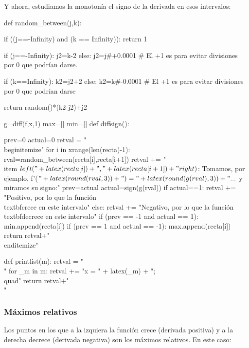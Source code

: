 
Y ahora, estudiamos la monotonía el signo de la derivada en esos intervalos:
   
\begin{sagesilent}

def random_between(j,k):
    

    if ((j==-Infinity) and (k == Infinity)):
        return 1

    if (j==-Infinity):
        j2=k-2
    else:
        j2=j#+0.0001 # El +1 es para evitar divisiones por 0 que podrían darse.
        
    if (k==Infinity):
        k2=j2+2
    else:        
        k2=k#-0.0001 # El +1 es para evitar divisiones por 0 que podrían darse

    return random()*(k2-j2)+j2

g=diff(f,x,1)
max=[]
min=[]
def diffsign():

    prev=0
    actual=0
    retval = "\\begin{itemize}"
    for i in xrange(len(recta)-1):
        rval=random_between(recta[i],recta[i+1])
        retval += "\\item $\\left("+latex(recta[i])+","+latex(recta[i+1])+"\\right)$: Tomamos, por ejemplo, f'($"+latex(round(rval,3))+") = "+latex(round(g(rval),3))+"...$  y miramos su signo:" 
        prev=actual
        actual=sign(g(rval))
        if actual==1: 
            retval += "Positivo, por lo que la función \\textbf{crece} en este intervalo"  
        else:
            retval += "Negativo, por lo que la función \\textbf{decrece} en este intervalo"
        if (prev == -1 and actual == 1):
            min.append(recta[i])
        if (prev == 1 and actual == -1):
            max.append(recta[i])
    return retval+"\\end{itemize}"

def printlist(m):
    retval = "\\{"
    for _m in m:
    	retval += "x = " + latex(_m) + ";\\quad"
    return retval+"\\}"

\end{sagesilent}


\subsubsection{Máximos relativos}
Los puntos en los que a la izquiera la función crece (derivada positiva) y a la derecha decrece (derivada negativa) son los máximos relativos. En este caso: 

